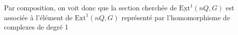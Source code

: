 \begin{center}
\end{center}


Par composition, on voit donc que la section cherchée de $\underline{\mathrm{Ext}}^1(nQ,G)$ est associée à l'élément de $\mathrm{Ext}^1(nQ,G)$ représenté par l'homomorphisme de complexes de degré 1

